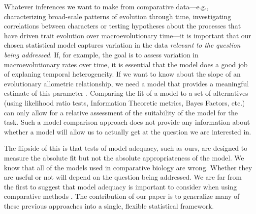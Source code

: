 Whatever inferences we want to make from comparative data---e.g., characterizing broad-scale patterns of evolution through time, investigating correlations between characters or testing hypotheses about the processes that have driven trait evolution over macroevolutionary time---it is important that our chosen statistical model captures variation in the data \emph{relevant to the question being addressed}. If, for example, the goal is to assess variation in macroevolutionary rates over time, it is essential that the model does a good job of explaning temporal heterogeneity. If we want to know about the slope of an evolutionary allometric relationship, we need a model that provides a meaningful estimate of this parameter \citep{Hansen2012SysBio}. Comparing the fit of a model to a set of alternatives (using likelihood ratio tests, Information Theoretic metrics, Bayes Factors, etc.) can only allow for a relative assessment of the suitability of the model for the task. Such a model comparison approach does not provide any information about whether a model will allow us to actually get at the question we are interested in. 

The flipside of this is that tests of model adequacy, such as ours, are designed to measure the absolute fit but not the absolute appropriateness of the model. We know that all of the models used in comparative biology are wrong. Whether they are useful or not will depend on the question being addressed. We are far from the first to suggest that model adequacy is important to consider when using comparative methods \citep[see, for example][]{Felsenstein1985, Felsenstein1988, HarveyPagel1991, Garland1992, Diaz1996, HansenMartins1996, Price1997, Garland1999, GarlandIves2000, HansenOrzack2005, Hansen2012SysBio, Felsenstein2012, Boettiger2012, SlaterPennell, Beaulieu2013, Blackmon2014}. The contribution of our paper is to generalize many of these previous approaches into a single, flexible statistical framework. 


